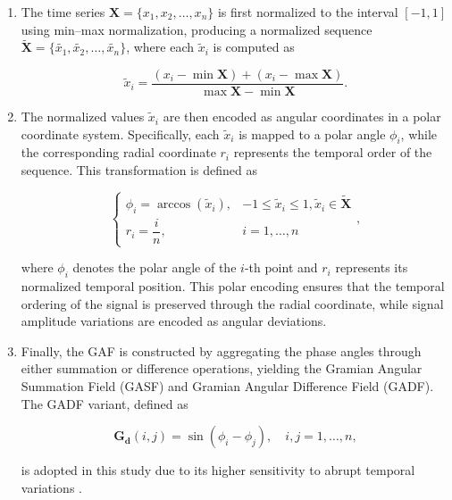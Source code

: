 \documentclass[journal]{IEEEtran}
\begin{document}
\begin{enumerate}
\item The time series $\boldsymbol{X} = \{x_1, x_2, \ldots, x_n\}$ is first normalized to the interval $[-1, 1]$ using min--max normalization, producing a normalized sequence $\boldsymbol{\tilde X} = \{\tilde{x_1}, \tilde{x_2}, \ldots, \tilde{x_n}\}$, where each $\tilde{x}_i$ is computed as

\begin{equation}
\tilde{x}_i = \frac{(x_i - \min \boldsymbol{X}) + (x_i - \max \boldsymbol{X})}{\max \boldsymbol{X} - \min \boldsymbol{X}}.
\label{normalization}
\end{equation}

\item The normalized values $\tilde{x}_i$ are then encoded as angular coordinates in a polar coordinate system. Specifically, each $\tilde{x}_i$ is mapped to a polar angle $\phi_i$, while the corresponding radial coordinate $r_i$ represents the temporal order of the sequence. This transformation is defined as

\begin{equation}
\begin{cases} 
\phi_i = \arccos(\tilde{x}_i), & -1 \leq \tilde{x}_i \leq 1,  \tilde{x}_i \in \boldsymbol{\tilde X} \\[4pt]
r_i = \dfrac{i}{n}, & i = 1, \ldots, n 
\end{cases},
\label{cosine angle}
\end{equation}

where $\phi_i$ denotes the polar angle of the $i$-th point and $r_i$ represents its normalized temporal position. This polar encoding ensures that the temporal ordering of the signal is preserved through the radial coordinate, while signal amplitude variations are encoded as angular deviations.

\item Finally, the GAF is constructed by aggregating the phase angles through either summation or difference operations, yielding the Gramian Angular Summation Field (GASF) and Gramian Angular Difference Field (GADF). The GADF variant, defined as

\begin{equation}
\boldsymbol{G_d}(i,j) = \sin(\phi_i - \phi_j), \quad i,j = 1,\ldots,n,
\label{eq:gadf}
\end{equation}

is adopted in this study due to its higher sensitivity to abrupt temporal variations \cite{11278186}.
\end{enumerate}
\end{document}
